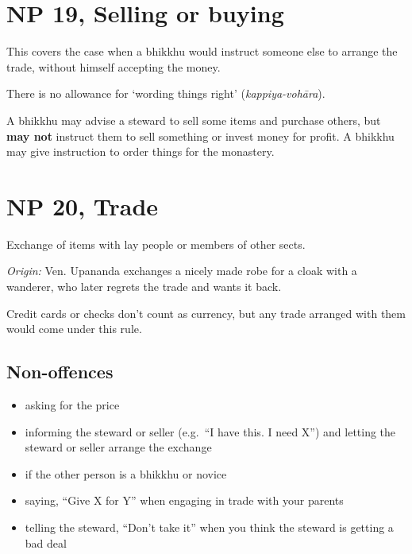 \section{NP 19, Selling or buying}

This covers the case when a bhikkhu would instruct someone else to
arrange the trade, without himself accepting the money.

There is no allowance for `wording things right'
(\emph{kappiya-vohāra}).

A bhikkhu may advise a steward to sell some items and purchase others,
but \textbf{may not} instruct them to sell something or invest money for
profit. A bhikkhu may give instruction to order things for the
monastery.

\section{NP 20, Trade}

Exchange of items with lay people or members of other sects.

\emph{Origin:} Ven. Upananda exchanges a nicely made robe for a cloak
with a wanderer, who later regrets the trade and wants it back.

Credit cards or checks don't count as currency, but any trade arranged
with them would come under this rule.

\enlargethispage*{\baselineskip}

\subsection{Non-offences}

\begin{itemize}
\tightlist
\item
  asking for the price
\item
  informing the steward or seller (e.g.~``I have this. I need X'') and
  letting the steward or seller arrange the exchange
\item
  if the other person is a bhikkhu or novice
\item
  saying, ``Give X for Y'' when engaging in trade with your parents
\item
  telling the steward, ``Don't take it'' when you think the steward is
  getting a bad deal
\end{itemize}

